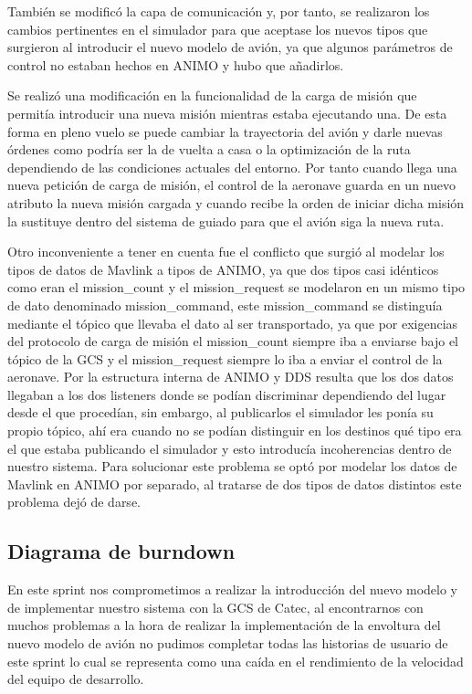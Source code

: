 \documentclass[12pt,a4paper,spanish]{book} %
\begin{document}
También se modificó la capa de comunicación y, por tanto, se realizaron los cambios pertinentes en el simulador para que aceptase los nuevos tipos que surgieron al introducir el nuevo modelo de avión, ya que algunos parámetros de control no estaban hechos en ANIMO y hubo que añadirlos.

Se realizó una modificación en la funcionalidad de la carga de misión que permitía introducir una nueva misión mientras estaba ejecutando una. De esta forma en pleno vuelo se puede cambiar la trayectoria del avión y darle nuevas órdenes como podría ser la de vuelta a casa o la optimización de la ruta dependiendo de las condiciones actuales del entorno. Por tanto cuando llega una nueva petición de carga de misión, el control de la aeronave guarda en un nuevo atributo la nueva misión cargada y cuando recibe la orden de iniciar dicha misión la sustituye dentro del sistema de guiado para que el avión siga la nueva ruta.

Otro inconveniente a tener en cuenta fue el conflicto que surgió al modelar los tipos de datos de Mavlink a tipos de ANIMO, ya que dos tipos casi idénticos como eran el mission\_count y el mission\_request se modelaron en un mismo tipo de dato denominado mission\_command, este mission\_command se distinguía mediante el tópico que llevaba el dato al ser transportado, ya que por exigencias del protocolo de carga de misión el mission\_count siempre iba a enviarse bajo el tópico de la GCS y el mission\_request siempre lo iba a enviar el control de la aeronave. Por la estructura interna de ANIMO y DDS resulta que los dos datos llegaban a los dos listeners donde se podían discriminar dependiendo del lugar desde el que procedían, sin embargo, al publicarlos el simulador les ponía su propio tópico, ahí era cuando no se podían distinguir en los destinos qué tipo era el que estaba publicando el simulador y esto introducía incoherencias dentro de nuestro sistema. Para solucionar este problema se optó por modelar los datos de Mavlink en ANIMO por separado, al tratarse de dos tipos de datos distintos este problema dejó de darse.

\subsection{Diagrama de burndown}

En este sprint nos comprometimos a realizar la introducción del nuevo modelo y de implementar nuestro sistema con la GCS de Catec, al encontrarnos con muchos problemas a la hora de realizar la implementación de la envoltura del nuevo modelo de avión no pudimos completar todas las historias de usuario de este sprint lo cual se representa como una caída en el rendimiento de la velocidad del equipo de desarrollo.
\end{document}
